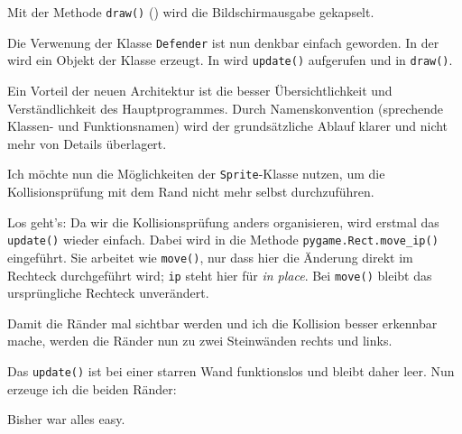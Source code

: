 Mit der Methode \texttt{draw()} () wird die Bildschirmausgabe gekapselt.


Die Verwenung der Klasse \texttt{Defender} ist nun denkbar einfach geworden. In der  wird ein Objekt der Klasse erzeugt. In  wird \texttt{update()} aufgerufen und in  \texttt{draw()}.

Ein Vorteil der neuen Architektur ist die besser Übersichtlichkeit und Verständlichkeit des Hauptprogrammes. Durch Namenskonvention (sprechende Klassen- und Funktionsnamen) wird der grundsätzliche Ablauf klarer und nicht mehr von Details überlagert.

Ich möchte nun die Möglichkeiten der \texttt{Sprite}-Klasse nutzen, um die Kollisionsprüfung mit dem Rand nicht mehr selbst durchzuführen. 


Los geht's: Da wir die Kollisionsprüfung anders organisieren, wird erstmal das \texttt{update()} wieder einfach. Dabei wird in  die Methode \texttt{pygame.Rect.move\_ip()} eingeführt. Sie arbeitet wie \texttt{move()}, nur dass hier die Änderung direkt im Rechteck durchgeführt wird; \texttt{ip} steht hier für \emph{in place}. Bei \texttt{move()} bleibt das ursprüngliche Rechteck unverändert.



Damit die Ränder mal sichtbar werden und ich die Kollision besser erkennbar mache, werden die Ränder nun zu zwei Steinwänden rechts und links.


Das \texttt{update()} ist bei einer starren Wand funktionslos und bleibt daher leer. Nun erzeuge ich die beiden Ränder:


Bisher war alles easy. 


